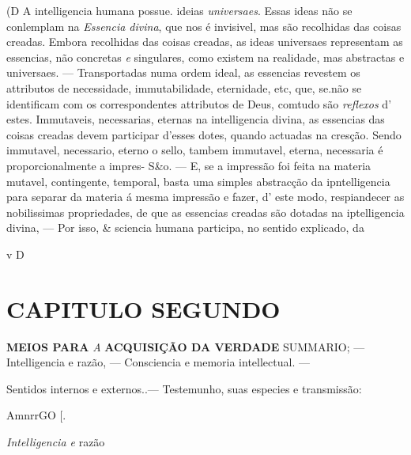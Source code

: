 (D A intelligencia humana possue. ideias \emph{universaes}. Essas ideas não se conlemplam na \emph{Essencia divina}, que nos é invisivel, mas são recolhidas das coisas creadas. Embora recolhidas das coisas creadas, as ideas universaes representam as essencias, não concretas \emph{e} singulares, como existem na realidade, mas abstractas e universaes. --- Transportadas numa ordem ideal, as essencias revestem os attributos de necessidade, immutabilidade, eternidade, etc, que, se.não se identificam com os correspondentes attributos de Deus, comtudo são \emph{reflexos} d' estes. Immutaveis, necessarias, eternas na intelligencia divina, as essencias das coisas creadas devem participar d'esses dotes, quando actuadas na cresção. Sendo immutavel, necessario, eterno o sello, tambem immutavel, eterna, necessaria é proporcionalmente a impres- S\&o. --- E, se a impressão foi feita na materia mutavel, contingente, temporal, basta uma simples abstracção da ipntelligencia para separar da materia á mesma impressão e fazer, d' este modo, respiandecer as nobilissimas propriedades, de que as essencias creadas são dotadas na iptelligencia divina, --- Por isso, \& sciencia humana participa, no sentido explicado, da

v D


\chapter*{CAPITULO SEGUNDO}

   \textbf{MEIOS PARA} \emph{A} \textbf{ACQUISIÇÃO DA VERDADE} \textsc{SUMMARIO}; --- Intelligencia e razão, --- Consciencia e memoria intellectual. ---

Sentidos internos e externos..--- Testemunho, suas especies e transmissão:

AmnrrGO [.

\emph{Intelligencia e} razão


